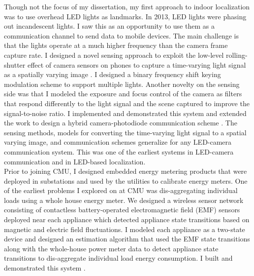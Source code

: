 \documentclass[10pt]{article}
\begin{document}
Though not the focus of my dissertation, my first approach to indoor localization was to use overhead LED lights as landmarks. In 2013, LED lights were phasing out incandescent lights. 
I saw this as an opportunity to use them as a communication channel to send data to mobile devices. The main challenge is that the lights operate at a much higher frequency than the camera frame capture rate. I designed a novel sensing approach to exploit the low-level rolling-shutter effect of camera sensors on phones to capture a time-varying light signal as a spatially varying image \cite{rajagopal2014visual, rajagopal2014demonstration}. 
I designed a binary frequency shift keying modulation scheme to support multiple lights.  Another novelty on the sensing side was that I modeled the exposure and focus control of the camera as filters that respond differently to the light signal and the scene captured to improve the signal-to-noise ratio.
I implemented and demonstrated this system \cite{rajagopal2014demonstration} and extended the work to design a hybrid camera-photodiode communication scheme \cite{rajagopal2014hybrid}.
The sensing methods, models for converting the time-varying light signal to a spatial varying image, and communication schemes generalize for any LED-camera communication system. This was one of the earliest systems in LED-camera communication and in LED-based localization.\\ %


Prior to joining CMU, I designed embedded energy metering products that were deployed in substations and used by the utilities to calibrate energy meters. %
One of the earliest problems I explored on at CMU was dis-aggregating individual loads using a whole house energy meter. 
We designed a wireless sensor network consisting of contactless battery-operated electromagnetic field (EMF) sensors deployed near each appliance which detected appliance state transitions based on magnetic and electric field fluctuations. I modeled each appliance as a two-state device 
and designed an estimation algorithm that used the EMF state transitions along with the whole-house power meter data to detect appliance state transitions \cite{rajagopal2013magnetic} to dis-aggregate individual load energy consumption.  I built and demonstrated this system \cite{rajagopal2013demo}. 
\end{document}
